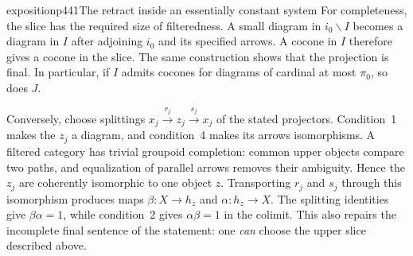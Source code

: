 \begin{dcomment}{exposition}{p441}{The retract inside an essentially constant system}
For completeness, the slice has the required size of filteredness. A small diagram in $i_0\backslash I$ becomes a diagram in $I$ after adjoining $i_0$ and its specified arrows. A cocone in $I$ therefore gives a cocone in the slice. The same construction shows that the projection is final. In particular, if $I$ admits cocones for diagrams of cardinal at most $\pi_0$, so does $J$.

Conversely, choose splittings $x_j\xrightarrow{r_j}z_j\xrightarrow{s_j}x_j$ of the stated projectors. Condition~1 makes the $z_j$ a diagram, and condition~4 makes its arrows isomorphisms. A filtered category has trivial groupoid completion: common upper objects compare two paths, and equalization of parallel arrows removes their ambiguity. Hence the $z_j$ are coherently isomorphic to one object $z$. Transporting $r_j$ and $s_j$ through this isomorphism produces maps $\beta:X\to h_z$ and $\alpha:h_z\to X$. The splitting identities give $\beta\alpha=1$, while condition~2 gives $\alpha\beta=1$ in the colimit. This also repairs the incomplete final sentence of the statement: one \emph{can} choose the upper slice described above.
\end{dcomment}

